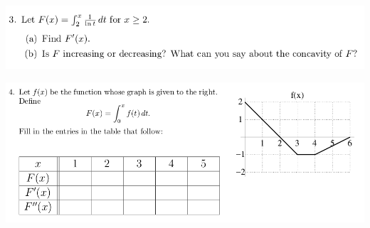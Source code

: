\documentclass[12pt]{article}
\begin{document}
\includegraphics [width=\textwidth]{6_4_FTCb}

\includegraphics [width=\textwidth]{6_4_FTCc}
\end{document}
